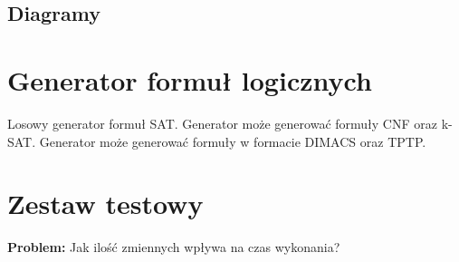 \documentclass[a4paper,12pt]{article}
\begin{document}
\begin{itemize}
\subsection{Diagramy}
%
%
%
%
%


\section{Generator formuł logicznych} \label{LFG}

Losowy generator formuł SAT. Generator może generować formuły \gls{CNF} oraz \gls{k-SAT}. Generator może generować formuły w formacie DIMACS oraz TPTP.

%

\newpage
\section{Zestaw testowy}


\noindent
\textbf{Problem:} Jak ilość zmiennych wpływa na czas wykonania?


\end{itemize}
\end{document}
